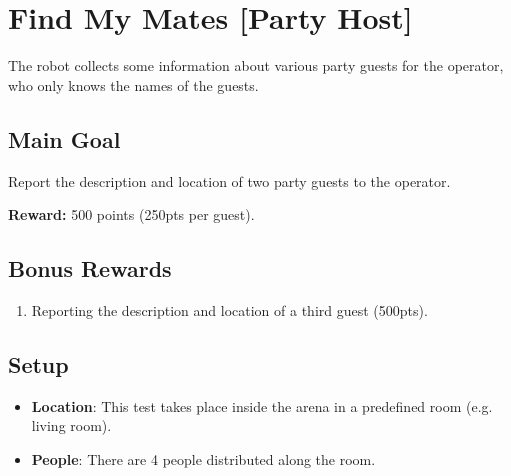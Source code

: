 \section{Find My Mates [Party Host]}
\label{test:find-my-mates}

The robot collects some information about various party guests for the operator, who only knows the names of the guests.

\subsection*{Main Goal}

Report the description and location of two party guests to the operator.

\noindent\textbf{Reward:} 500 points (250pts per guest).

\subsection*{Bonus Rewards}
\begin{enumerate}[nosep]
	\item Reporting the description and location of a third guest (500pts).
\end{enumerate}

\subsection*{Setup}
\begin{itemize}
	\item \textbf{Location}: This test takes place inside the arena in a predefined room (e.g. living room).
	\item \textbf{People}: There are 4 people distributed along the room.
\end{itemize}

